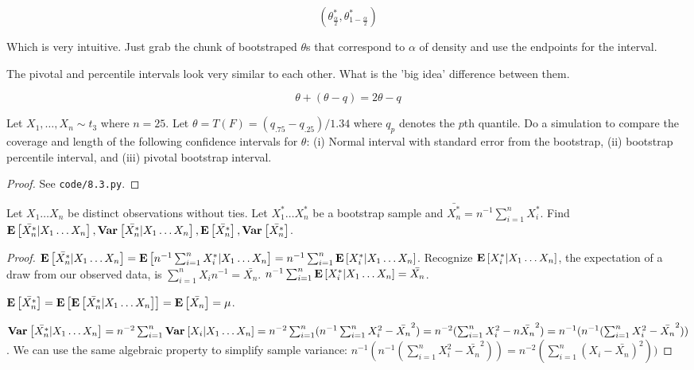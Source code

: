 \documentclass[10pt]{article}
\begin{document}
\[(\theta^*_{\frac{\alpha}{2}},  \theta^*_{1-\frac{\alpha}{2}})\]

Which is very intuitive. Just grab the chunk of bootstraped $\theta$s that
correspond to $\alpha$ of density and use the endpoints for the interval.

\begin{note}
    The pivotal and percentile intervals look very similar to each other. What
    is the 'big idea' difference between them.


    \[\theta + (\theta - q) = 2\theta - q\]
\end{note}

\setcounter{exercise}{2}
\begin{exercise}
    Let $X_1, \dots, X_n \sim t_3$ where $n = 25$. Let $\theta = T(F) =
    (q_{.75} - q_{.25})/1.34$ where $q_p$ denotes the $p$th quantile. Do a
    simulation to compare the coverage and length of the following confidence
    intervals for $\theta$: (i) Normal interval with standard error from the
    bootstrap, (ii) bootstrap percentile interval, and (iii) pivotal bootstrap
    interval.
\end{exercise}
\begin{proof}
    See \texttt{code/8.3.py}.
\end{proof}

\setcounter{exercise}{4}
\begin{exercise}
    Let $X_1 \dots X_n$ be distinct observations without ties. Let $X^*_1 \dots
    X^*_n$ be a bootstrap sample and $\bar{X^*_n} = n^{-1}\sum_{i=1}^n X^*_i$.
    Find $\operatorname{\mathbf{E}}\left[\bar{X^*_n}|X_1 \dots X_n\right], \operatorname{\mathbf{Var}}_{}\left[\bar{X^*_n}|X_1 \dots X_n\right],
    \operatorname{\mathbf{E}}\left[\bar{X^*_n}\right], \operatorname{\mathbf{Var}}_{}\left[\bar{X^*_n}\right]$.
\end{exercise}

\begin{proof}
    $\operatorname{\mathbf{E}}\left[\bar{X^*_n}|X_1 \dots X_n\right] = \operatorname{\mathbf{E}}\left[n^{-1}\sum_{i=1}^n X^*_i |X_1 \dots
    X_n\right] = n^{-1}\sum_{i=1}^n\operatorname{\mathbf{E}}\left[X^*_i |X_1 \dots X_n\right]$. Recognize $\operatorname{\mathbf{E}}\left[X^*_i
    |X_1 \dots X_n\right]$, the expectation of a draw from our observed data, is
    $\sum_{i=1}^n X_i n^{-1} = \bar{X_n}$. $n^{-1}\sum_{i=1}^n\operatorname{\mathbf{E}}\left[X^*_i |X_1
    \dots X_n\right] = \bar{X_n}$.

    $\operatorname{\mathbf{E}}\left[\bar{X^*_n}\right] =  \operatorname{\mathbf{E}}\left[\operatorname{\mathbf{E}}\left[\bar{X^*_n}|X_1 \dots X_n\right]\right] = \operatorname{\mathbf{E}}\left[\bar{X_n}\right] = \mu$.

    $\operatorname{\mathbf{Var}}_{}\left[\bar{X^*_n}|X_1 \dots X_n\right] = n^{-2} \sum_{i=1}^n \operatorname{\mathbf{Var}}_{}\left[X_i | X_1 \dots
    X_n\right] = n^{-2} \sum_{i=1}^n (n^{-1} \sum_{i=1}^n X_i^2 - \bar{X_n}^2) =
    n^{-2} (\sum_{i=1}^n X_i^2 - n\bar{X_n}^2) = n^{-1}(n^{-1}(\sum_{i=1}^n X_i^2 - \bar{X_n}^2))$. We
    can use the same algebraic property to simplify sample variance:
    $n^{-1}(n^{-1}(\sum_{i=1}^n X_i^2 - \bar{X_n}^2)) =
    n^{-2}(\sum_{i=1}^n (X_i - \bar{X_n})^2))$ 

\end{proof}
\end{document}
